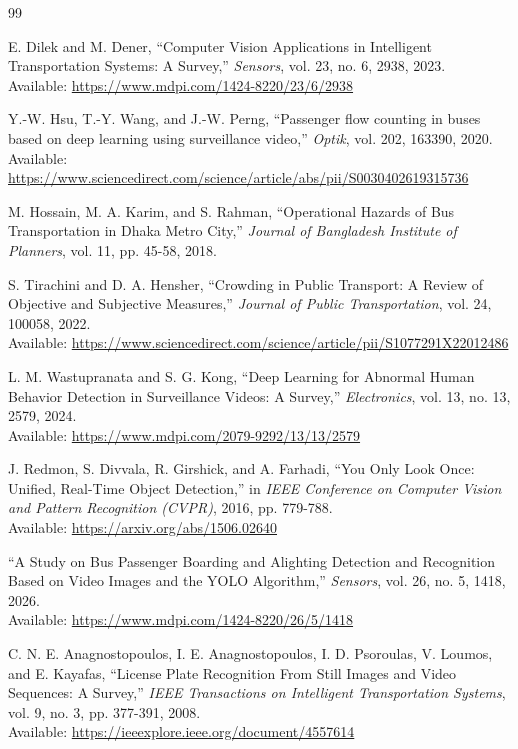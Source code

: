 \documentclass[conference]{IEEEtran}
\begin{document}
\FloatBarrier
\begin{thebibliography}{99}

E. Dilek and M. Dener,
``Computer Vision Applications in Intelligent Transportation Systems: A Survey,''
\textit{Sensors}, vol. 23, no. 6, 2938, 2023.\\
Available: \url{https://www.mdpi.com/1424-8220/23/6/2938}

Y.-W. Hsu, T.-Y. Wang, and J.-W. Perng,
``Passenger flow counting in buses based on deep learning using surveillance video,''
\textit{Optik}, vol. 202, 163390, 2020.\\
Available: \url{https://www.sciencedirect.com/science/article/abs/pii/S0030402619315736}

M. Hossain, M. A. Karim, and S. Rahman,
``Operational Hazards of Bus Transportation in Dhaka Metro City,''
\textit{Journal of Bangladesh Institute of Planners}, vol. 11, pp. 45-58, 2018.

S. Tirachini and D. A. Hensher,
``Crowding in Public Transport: A Review of Objective and Subjective Measures,''
\textit{Journal of Public Transportation}, vol. 24, 100058, 2022.\\
Available: \url{https://www.sciencedirect.com/science/article/pii/S1077291X22012486}

L. M. Wastupranata and S. G. Kong,
``Deep Learning for Abnormal Human Behavior Detection in Surveillance Videos: A Survey,''
\textit{Electronics}, vol. 13, no. 13, 2579, 2024.\\
Available: \url{https://www.mdpi.com/2079-9292/13/13/2579}

J. Redmon, S. Divvala, R. Girshick, and A. Farhadi,
``You Only Look Once: Unified, Real-Time Object Detection,''
in \textit{IEEE Conference on Computer Vision and Pattern Recognition (CVPR)}, 2016, pp. 779-788.\\
Available: \url{https://arxiv.org/abs/1506.02640}

``A Study on Bus Passenger Boarding and Alighting Detection and Recognition Based on Video Images and the YOLO Algorithm,''
\textit{Sensors}, vol. 26, no. 5, 1418, 2026.\\
Available: \url{https://www.mdpi.com/1424-8220/26/5/1418}

C. N. E. Anagnostopoulos, I. E. Anagnostopoulos, I. D. Psoroulas, V. Loumos, and E. Kayafas,
``License Plate Recognition From Still Images and Video Sequences: A Survey,''
\textit{IEEE Transactions on Intelligent Transportation Systems}, vol. 9, no. 3, pp. 377-391, 2008.\\
Available: \url{https://ieeexplore.ieee.org/document/4557614}


\end{thebibliography}
\end{document}
